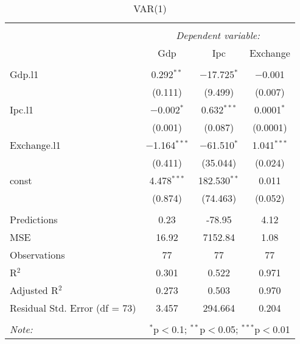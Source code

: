 
\begin{table}[H] \centering 
  \caption{VAR(1)} 
  \label{tb:var_1} 
\begin{tabular}{@{\extracolsep{5pt}}lccc} 
\\[-1.8ex]\hline 
\hline \\[-1.8ex] 
 & \multicolumn{3}{c}{\textit{Dependent variable:}} \\ 
\cline{2-4} 
 & Gdp & Ipc & Exchange \\ 
\hline \\[-1.8ex] 
 Gdp.l1 & 0.292$^{**}$ & $-$17.725$^{*}$ & $-$0.001 \\ 
  & (0.111) & (9.499) & (0.007) \\ 
  Ipc.l1 & $-$0.002$^{*}$ & 0.632$^{***}$ & 0.0001$^{*}$ \\ 
  & (0.001) & (0.087) & (0.0001) \\ 
  Exchange.l1 & $-$1.164$^{***}$ & $-$61.510$^{*}$ & 1.041$^{***}$ \\ 
  & (0.411) & (35.044) & (0.024) \\ 
  const & 4.478$^{***}$ & 182.530$^{**}$ & 0.011 \\ 
  & (0.874) & (74.463) & (0.052) \\ 
 \hline \\[-1.8ex] 
Predictions & 0.23 & -78.95 & 4.12 \\ 
MSE & 16.92 & 7152.84 & 1.08 \\ 
Observations & 77 & 77 & 77 \\ 
R$^{2}$ & 0.301 & 0.522 & 0.971 \\ 
Adjusted R$^{2}$ & 0.273 & 0.503 & 0.970 \\ 
Residual Std. Error (df = 73) & 3.457 & 294.664 & 0.204 \\ 
\hline 
\hline \\[-1.8ex] 
\textit{Note:}  & \multicolumn{3}{r}{$^{*}$p$<$0.1; $^{**}$p$<$0.05; $^{***}$p$<$0.01} \\ 
\end{tabular} 
\end{table} 

